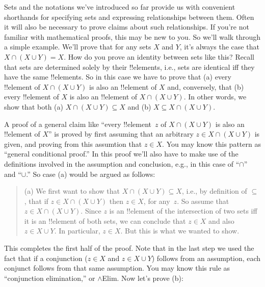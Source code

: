 \documentclass[../../../include/open-logic-section]{subfiles}
\begin{document}

\begin{explain}
Sets and the notations we've introduced so far provide us with
convenient shorthands for specifying sets and expressing relationships
between them.  Often it will also be necessary to prove claims about
such relationships.  If you're not familiar with mathematical proofs,
this may be new to you.  So we'll walk through a simple example.  We'll
prove that for any sets $X$ and $Y$, it's always the case that $X \cap
(X \cup Y) = X$.  How do you prove an identity between sets like this?
Recall that sets are determined solely by their !!{element}s, i.e.,
sets are identical iff they have the same !!{element}s.  So in this
case we have to prove that (a) every !!{element} of $X \cap (X \cup
Y)$ is also an !!{element} of $X$ and, conversely, that (b) every
!!{element} of $X$ is also an !!{element} of $X \cap (X \cup Y)$.  In
other words, we show that both (a) $X \cap (X \cup Y) \subseteq X$ and
(b) $X \subseteq X \cap (X \cup Y)$.

A proof of a general claim like ``every !!{element}~$z$ of $X \cap (X
\cup Y)$ is also an !!{element} of $X$'' is proved by first assuming
that an arbitrary $z \in X \cap (X \cup Y)$ is given, and proving from
this assumtion that $z \in X$.  You may know this pattern as ``general
conditional proof.''  In this proof we'll also have to make use of the
definitions involved in the assumption and conclusion, e.g., in this
case of ``$\cap$'' and ``$\cup$.''  So case (a) would be argued as
follows:

\begin{quote}
(a) We first want to show that $X \cap (X \cup Y) \subseteq X$, i.e.,
by definition of $\subseteq$, that if $z \in X \cap (X \cup Y)$ then
$z \in X$, for any~$z$.  So assume that $z \in X \cap (X \cup
Y)$. Since $z$ is an !!{element} of the intersection of two sets iff
it is an !!{element} of both sets, we can conclude that $z \in X$ and
also $z \in X \cup Y$.  In particular, $z \in X$.  But this is what
we wanted to show.
\end{quote}

This completes the first half of the proof.  Note that in the last
step we used the fact that if a conjunction ($z \in X$ and $z \in X
\cup Y$) follows from an assumption, each conjunct follows from that
same assumption.  You may know this rule as ``conjunction
elimination,'' or $\land$Elim.  Now let's prove (b):


\end{explain}
\end{document}
